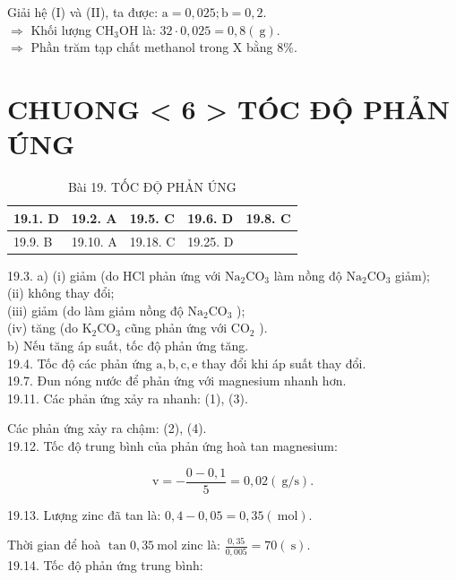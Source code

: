 \documentclass[10pt]{article}
\begin{document}
Giải hệ (I) và (II), ta được: $\mathrm{a}=0,025 ; \mathrm{b}=0,2$.\\
$\Rightarrow$ Khối lượng $\mathrm{CH}_{3} \mathrm{OH}$ là: $32 \cdot 0,025=0,8(\mathrm{~g})$.\\
$\Rightarrow$ Phần trăm tạp chất methanol trong X bằng $8 \%$.

\section*{CHUONG < 6 > TÓC ĐỘ PHẢN ÚNG}
\begin{table}[h]
\begin{center}
\captionsetup{labelformat=empty}
\caption{Bài 19. TỐC ĐỘ PHẢN ÚNG}
\begin{tabular}{|l|l|l|l|l|}
\hline
19.1. D & 19.2. A & 19.5. C & 19.6. D & 19.8. C \\
\hline
19.9. B & 19.10. A & 19.18. C & 19.25. D &  \\
\hline
\end{tabular}
\end{center}
\end{table}

19.3. a) (i) giảm (do HCl phản ứng với $\mathrm{Na}_{2} \mathrm{CO}_{3}$ làm nồng độ $\mathrm{Na}_{2} \mathrm{CO}_{3}$ giảm);\\
(ii) không thay đổi;\\
(iii) giảm (do làm giảm nồng độ $\mathrm{Na}_{2} \mathrm{CO}_{3}$ );\\
(iv) tăng (do $\mathrm{K}_{2} \mathrm{CO}_{3}$ cũng phản ứng với $\mathrm{CO}_{2}$ ).\\
b) Nếu tăng áp suất, tốc độ phản ứng tăng.\\
19.4. Tốc độ các phản ứng $\mathrm{a}, \mathrm{b}, \mathrm{c}, \mathrm{e}$ thay đổi khi áp suất thay đổi.\\
19.7. Đun nóng nước để phản ứng với magnesium nhanh hơn.\\
19.11. Các phản ứng xảy ra nhanh: (1), (3).

Các phản ứng xảy ra chậm: (2), (4).\\
19.12. Tốc độ trung bình của phản ứng hoà tan magnesium:

$$
\mathrm{v}=-\frac{0-0,1}{5}=0,02(\mathrm{~g} / \mathrm{s}) .
$$

19.13. Lượng zinc đã tan là: $0,4-0,05=0,35(\mathrm{~mol})$.

Thời gian để hoà $\tan 0,35 \mathrm{~mol}$ zinc là: $\frac{0,35}{0,005}=70(\mathrm{~s})$.\\
19.14. Tốc độ phản ứng trung bình:
\end{document}
